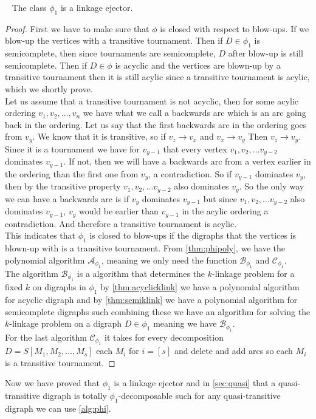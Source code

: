 \begin{lemma}~\cite{bangJGT85}
    The class $\phi_1$ is a linkage ejector.
    \label{thm:phi1ejector}
\end{lemma}
\begin{proof}
    First we have to make sure that $\phi$ is closed with respect to blow-ups. 
    If we blow-up the vertices with a transitive tournament.
    Then if $D\in \phi_1$ is semicomplete, then since tournaments are semicomplete, $D$ after blow-up is still semicomplete.
    Then if $D\in \phi$ is acyclic and the vertices are blown-up by a transitive tournament then it is still acylic since a transitive tournament is acylic, which we shortly prove.\\
    Let us assume that a transitive tournament is not acyclic, then for some acylic ordering $v_1,v_2,\dots , v_n$ we have what we call a backwards arc which is an arc going back in the ordering. 
    Let us say that the first backwards arc in the ordering goes from $v_y$. 
    We know that it is transitive, so if $v_z \rightarrow v_x$ and $v_x \rightarrow v_y$ Then $v_z\rightarrow v_y$. 
    Since it is a tournament we have for $v_{y-1}$ that every vertex $v_1,v_2,\dots v_{y-2}$ dominates $v_{y-1}$. 
    If not, then we will have a backwards arc from a vertex earlier in the ordering than the first one from $v_y$, a contradiction.
    So if $v_{y-1}$ dominates $v_y$, then by the transitive property $v_1,v_2,\dots v_{y-2}$ also dominates $v_y$.
    So the only way we can have a backwards arc is if $v_y$ dominates $v_{y-1}$ but since $v_1,v_2,\dots v_{y-2}$ also dominates $v_{y-1}$, $v_y$ would be earlier than $v_{y-1}$ in the acylic ordering a contradiction. And therefore a transitive tournament is acylic.\\
    This indicates that $\phi_1$ is closed to blow-ups if the digraphs that the vertices is blown-up with is a transitive tournament.
    From \autoref{thm:phipoly}, we have the polynomial algorithm $\mathcal{A}_{\phi_1}$, meaning we only need the function $\mathcal{B}_{\phi_1}$ and $\mathcal{C}_{\phi_1}$.\\
    The algorithm $\mathcal{B}_{\phi_1}$ is a algorithm that determines the $k$-linkage problem for a fixed $k$ on digraphs in $\phi_1$ by \autoref{thm:acyclicklink} we have a polynomial algorithm for acyclic digraph and by \autoref{thm:semiklink} we have a polynomial algorithm for semicomplete digraphs such combining these we have an algorithm for solving the $k$-linkage problem on a digraph $D\in \phi_1$ meaning we have $\mathcal{B}_{\phi_1}$. \\
    For the last algorithm $\mathcal{C}_{\phi_1}$ it takes for every decomposition $D=S[M_1,M_2,\dots , M_s]$ each $M_i$ for $i=[s]$ and delete and add arcs so each $M_i$ is a transitive tournament.
\end{proof}

Now we have proved that $\phi_1$ is a linkage ejector and in \autoref{sec:quasi} that a quasi-transitive digraph is totally $\phi_1$-decomposable such for any quasi-transitive digraph we can use \autoref{alg:phi}.  